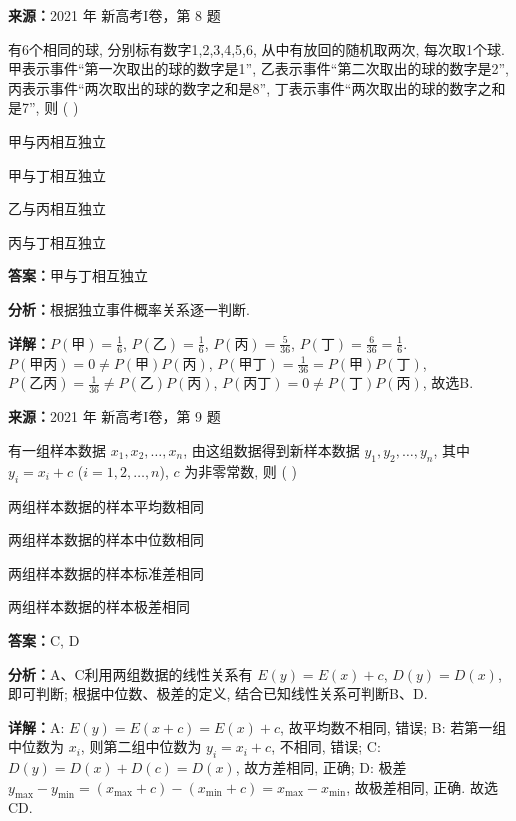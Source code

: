 \begin{question}[points=5]
\textbf{来源：}2021 年 新高考I卷，第 8 题\par
有6个相同的球, 分别标有数字1,2,3,4,5,6, 从中有放回的随机取两次, 每次取1个球. 甲表示事件“第一次取出的球的数字是1”, 乙表示事件“第二次取出的球的数字是2”, 丙表示事件“两次取出的球的数字之和是8”, 丁表示事件“两次取出的球的数字之和是7”, 则 ( )
\begin{choices}
  \item 甲与丙相互独立
  \item 甲与丁相互独立
  \item 乙与丙相互独立
  \item 丙与丁相互独立
\end{choices}
\begin{solution}
\textbf{答案：}甲与丁相互独立

\textbf{分析：}根据独立事件概率关系逐一判断.

\textbf{详解：}$P(\text{甲}) = \frac{1}{6}$, $P(\text{乙}) = \frac{1}{6}$, $P(\text{丙}) = \frac{5}{36}$, $P(\text{丁}) = \frac{6}{36} = \frac{1}{6}$. $P(\text{甲丙}) = 0 \neq P(\text{甲})P(\text{丙})$, $P(\text{甲丁}) = \frac{1}{36} = P(\text{甲})P(\text{丁})$, $P(\text{乙丙}) = \frac{1}{36} \neq P(\text{乙})P(\text{丙})$, $P(\text{丙丁}) = 0 \neq P(\text{丁})P(\text{丙})$, 故选B.
\end{solution}
\end{question}

\begin{question}[points=5]
\textbf{来源：}2021 年 新高考I卷，第 9 题\par
有一组样本数据 $x_1, x_2, \ldots, x_n$, 由这组数据得到新样本数据 $y_1, y_2, \ldots, y_n$, 其中 $y_i = x_i + c$ ($i = 1,2,\ldots,n$), $c$ 为非零常数, 则 ( )
\begin{choices}
  \item 两组样本数据的样本平均数相同
  \item 两组样本数据的样本中位数相同
  \item 两组样本数据的样本标准差相同
  \item 两组样本数据的样本极差相同
\end{choices}
\begin{solution}
\textbf{答案：}C, D

\textbf{分析：}A、C利用两组数据的线性关系有 $E(y) = E(x) + c$, $D(y) = D(x)$, 即可判断; 根据中位数、极差的定义, 结合已知线性关系可判断B、D.

\textbf{详解：}A: $E(y) = E(x+c) = E(x) + c$, 故平均数不相同, 错误; B: 若第一组中位数为 $x_i$, 则第二组中位数为 $y_i = x_i + c$, 不相同, 错误; C: $D(y) = D(x) + D(c) = D(x)$, 故方差相同, 正确; D: 极差 $y_{\max} - y_{\min} = (x_{\max} + c) - (x_{\min} + c) = x_{\max} - x_{\min}$, 故极差相同, 正确. 故选CD.
\end{solution}
\end{question}


